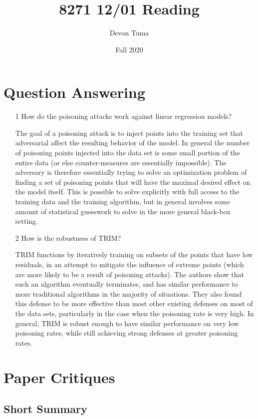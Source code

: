 \documentclass[11pt]{article}
\title{8271 12/01 Reading}
\author{Devon Tuma}
\date{Fall 2020}
\begin{document}
\maketitle

\section*{Question Answering}

\begin{itemize}
\item [1] How do the poisoning attacks work against linear regression models?

  The goal of a poisoning attack is to inject points into the training set that adversarial affect the resulting behavior of the model.
  In general the number of poisoning points injected into the data set is some small portion of the entire data (or else counter-measures are essentially impossible).
  The adversary is therefore essentially trying to solve an optimization problem of finding a set of poisoning points that will have the maximal desired effect on the model itself.
  This is possible to solve explicitly with full access to the training data and the training algorithm, but in general involves some amount of statistical guesswork to solve in the more general black-box setting.
  
\item [2] How is the robustness of TRIM?

  TRIM functions by iteratively training on subsets of the points that have low residuals, in an attempt to mitigate the influence of extreme points (which are more likely to be a result of poisoning attacks).
  The authors show that such an algorithm eventually terminates, and has similar performance to more traditional algorithms in the majority of situations.
  They also found this defense to be more effective than most other existing defenses on most of the data sets, particularly in the case when the poisoning rate is very high.
  In general, TRIM is robust enough to have similar performance on very low poisoning rates, while still achieving strong defenses at greater poisoning rates.
\end{itemize}

\section*{Paper Critiques}

\subsection*{Short Summary}
\end{document}
